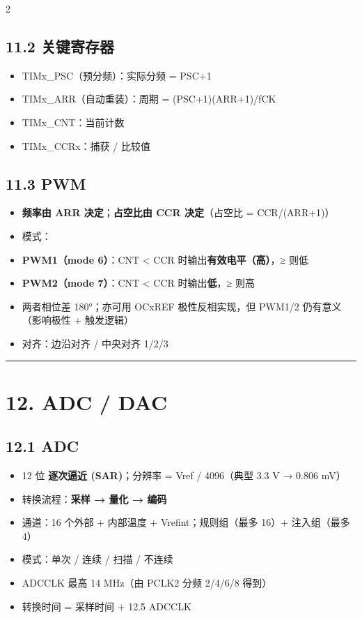 \documentclass[UTF8,zihao=-5]{ctexart}
\begin{document}
\begin{multicols*}{2}
\subsection*{11.2 关键寄存器}
\begin{itemize}
\item TIMx\_PSC（预分频）：实际分频 = PSC+1
\item TIMx\_ARR（自动重装）：周期 = (PSC+1)(ARR+1)/fCK
\item TIMx\_CNT：当前计数
\item TIMx\_CCRx：捕获 / 比较值
\end{itemize}
\subsection*{11.3 PWM}
\begin{itemize}
\item \textbf{频率由 ARR 决定}；\textbf{占空比由 CCR 决定}（占空比 = CCR/(ARR+1)）
\item 模式：
\item \textbf{PWM1（mode 6）}：CNT < CCR 时输出\textbf{有效电平（高）}，≥ 则低
\item \textbf{PWM2（mode 7）}：CNT < CCR 时输出\textbf{低}，≥ 则高
\item 两者相位差 180°；亦可用 OCxREF 极性反相实现，但 PWM1/2 仍有意义（影响极性 + 触发逻辑）
\item 对齐：边沿对齐 / 中央对齐 1/2/3
\end{itemize}
\vspace{1pt}\hrule\vspace{1pt}
\section*{12. ADC / DAC}
\subsection*{12.1 ADC}
\begin{itemize}
\item 12 位 \textbf{逐次逼近 (SAR)}；分辨率 = Vref / 4096（典型 3.3 V → 0.806 mV）
\item 转换流程：\textbf{采样 → 量化 → 编码}
\item 通道：16 个外部 + 内部温度 + Vrefint；规则组（最多 16）+ 注入组（最多 4）
\item 模式：单次 / 连续 / 扫描 / 不连续
\item ADCCLK 最高 14 MHz（由 PCLK2 分频 2/4/6/8 得到）
\item 转换时间 = 采样时间 + 12.5 ADCCLK
\end{itemize}

\end{multicols*}
\end{document}
